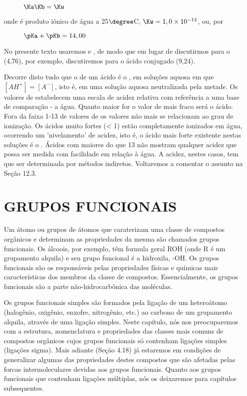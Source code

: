 \begin{figure}[H]
    \centering
    $\Ka\Kb=\Kw$
\end{figure}

\noindent onde \Kw\enspace é produto iônico de água a 25$\degree$C, $\Kw = 1,0 \times 10^{-14}$, ou, por

\begin{figure}
    \centering
    $\pKa + \pKb = 14,00$
\end{figure}

\noindent No presente texto usaremos \Ka\enspace e \pKa, de modo que em lugar de discutirmos \pKb\enspace para o  (4,76), por exemplo, discutiremos \pKa\enspace para o ácido conjugado  (9,24).

Decorre disto tudo que o \pKa\enspace de um ácido é o \pH, em soluções aquosa em que $[AH^+] = [A^-]$, isto é, em uma solução aquosa neutralizada pela metade. Os valores de \pKa\enspace estabelecem uma escala de acidez relativa com referência a uma base de comparação - a água. Quanto maior for o valor de \pKa\enspace mais fraco será o ácido. Fora da faixa 1-13 de valores de \pKa\enspace os valores não mais se relacionam ao grau de ionização. Os ácidos muito fortes (\pKa\enspace < 1) estão completamente ionizados em água, ocorrendo um 'nivelamento' de acidez, isto é, o ácido mais forte existente nestas soluções é o . Ácidos com \pKa\enspace maiores do que 13 não mostram qualquer acidez que possa ser medida com facilidade em relação à água. A acidez, nestes casos, tem que ser determinada por métodos indiretos. Voltaremos a comentar o assunto na Seção 12.3.

\section{GRUPOS FUNCIONAIS}

Um átomo ou grupos de átomos que caraterizam uma classe de compostos orgânicos e determinam as propriedades da mesma são chamados grupos funcionais. Os álcoois, por exemplo, têm formula geral ROH (onde R é um grupamento alquila) e seu grupo funcional é a hidroxila, -OH. Os grupos funcionais são os responsáveis pelas propriedades físicas e químicas mais características dos membros da classe de compostos. Essencialmente, os grupos funcionais são a parte não-hidrocarbônica das moléculas. 

Os grupos funcionais simples são formados pela ligação de um heteroátomo (halogênio, oxigênio, enxofre, nitrogênio, etc.) ao carbono de um grupamento alquila, através de uma ligação simples. Neste capítulo, nós nos preocuparemos com a estrutura, nomenclatura e propriedades das classes mais comuns de compostos orgânicos cujos grupos funcionais só contenham ligações simples (ligações sigma). Mais adiante (Seção 4.18) já estaremos em condições de generalizar algumas das propriedades destes compostos que são afetadas pelas forcas intermoleculares devidas aos grupos funcionais. Quanto aos grupos funcionais que contenham ligações múltiplas, nós os deixaremos para capítulos subsequentes.

